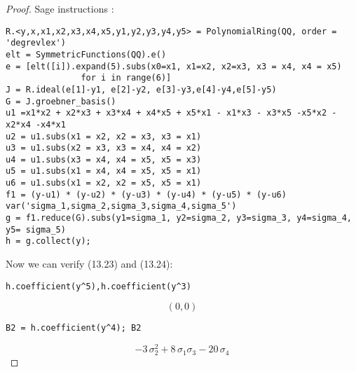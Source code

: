 \documentclass[11pt,a4paper]{article}
\begin{document}
\begin{proof}
Sage instructions :
\begin{verbatim}
R.<y,x,x1,x2,x3,x4,x5,y1,y2,y3,y4,y5> = PolynomialRing(QQ, order = 'degrevlex')
elt = SymmetricFunctions(QQ).e()
e = [elt([i]).expand(5).subs(x0=x1, x1=x2, x2=x3, x3 = x4, x4 = x5) 
               for i in range(6)]
J = R.ideal(e[1]-y1, e[2]-y2, e[3]-y3,e[4]-y4,e[5]-y5)
G = J.groebner_basis()
u1 =x1*x2 + x2*x3 + x3*x4 + x4*x5 + x5*x1 - x1*x3 - x3*x5 -x5*x2 - x2*x4 -x4*x1
u2 = u1.subs(x1 = x2, x2 = x3, x3 = x1)
u3 = u1.subs(x2 = x3, x3 = x4, x4 = x2)
u4 = u1.subs(x3 = x4, x4 = x5, x5 = x3)
u5 = u1.subs(x1 = x4, x4 = x5, x5 = x1)
u6 = u1.subs(x1 = x2, x2 = x5, x5 = x1)
f1 = (y-u1) * (y-u2) * (y-u3) * (y-u4) * (y-u5) * (y-u6) 
var('sigma_1,sigma_2,sigma_3,sigma_4,sigma_5')
g = f1.reduce(G).subs(y1=sigma_1, y2=sigma_2, y3=sigma_3, y4=sigma_4, y5= sigma_5)
h = g.collect(y);
\end{verbatim}

\bigskip

Now we can verify (13.23) and (13.24):

\begin{verbatim}
h.coefficient(y^5),h.coefficient(y^3)
\end{verbatim}
$$(0,0)$$
\begin{verbatim}
B2 = h.coefficient(y^4); B2
\end{verbatim}
$$	
-3 \, \sigma_{2}^{2} + 8 \, \sigma_{1} \sigma_{3} - 20 \, \sigma_{4}
$$


\end{proof}
\end{document}

